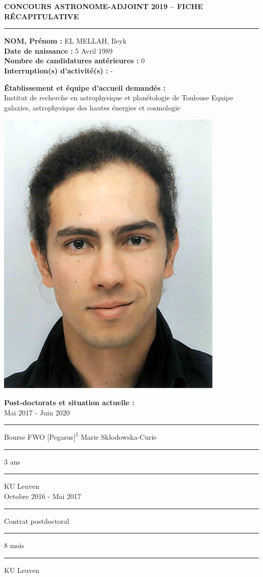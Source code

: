 \documentclass[11pt]{article}
\begin{document}
\begin{center}
\textbf {CONCOURS ASTRONOME-ADJOINT 2019 -- FICHE R\'ECAPITULATIVE}\\ 
\vspace{0.2cm}


\hrule
\end{center}


\begin{minipage}{11cm}

\vspace{0.2cm}

{\bf NOM, Pr\'enom :} EL MELLAH, Ileyk\\
{\bf Date de naissance :} 5 Avril 1989 \\
{\bf Nombre de candidatures ant\'erieures :} 0 \\
{\bf Interruption(s) d'activit\'e(s) :}  - 

\vspace{0.1cm}

{\bf \'Etablissement et \'equipe d'accueil demand\'es :}\\
Institut de recherche en astrophysique et plan\'{e}tologie de Toulouse Equipe galaxies, astrophysique des hautes \'{e}nergies et cosmologie



\end{minipage}  
\hspace{1.5cm}
\begin{minipage}{4cm}
\includegraphics[height=4.cm] {ID_photo.png}
\end{minipage}



\vspace{0cm}
{\bf Post-doctorats et situation actuelle :}\\
Mai 2017 - Juin 2020 \rule[-0.4ex]{0.2ex}{1.2em} Bourse FWO $[$Pegasus$]^2$ Marie Sk\l{}odowska-Curie \rule[-0.4ex]{0.2ex}{1.2em} 3 ans \rule[-0.4ex]{0.2ex}{1.2em} KU Leuven\\
Octobre 2016 - Mai 2017 \rule[-0.4ex]{0.2ex}{1.2em} Contrat postdoctoral \rule[-0.4ex]{0.2ex}{1.2em} 8 mois \rule[-0.4ex]{0.2ex}{1.2em} KU Leuven\\
\end{document}
